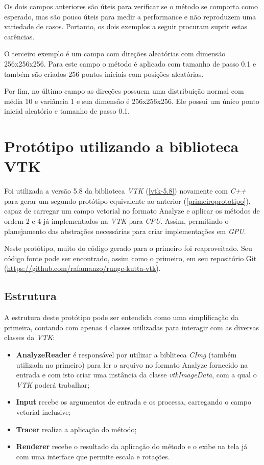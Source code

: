   Os dois campos anteriores são úteis para verificar se o método se comporta como esperado, mas são pouco úteis para medir a performance e não reproduzem uma variedade de casos. Portanto, os dois exemplos a seguir procuram suprir estas carências.
  
  O terceiro exemplo é um campo com direções aleatórias com dimensão 256x256x256. Para este campo o método é aplicado com tamanho de passo 0.1 e também são criados 256 pontos iniciais com posições aleatórias.
  
  Por fim, no último campo as direções possuem uma distribuição normal com média 10 e variância 1 e sua dimensão é 256x256x256. Ele possui um único ponto inicial aleatório e tamanho de passo 0.1.

\section{Protótipo utilizando a biblioteca VTK}
  Foi utilizada a versão 5.8 da biblioteca \textit{VTK} (\ref{vtk-5.8}) novamente com \textit{C++} para gerar um segundo protótipo equivalente ao anterior (\ref{primeiroprototipo}), capaz de carregar um campo vetorial no formato Analyze e aplicar os métodos de ordem 2 e 4 já implementados na \textit{VTK} para \textit{CPU}. Assim, permitindo o planejamento das abstrações necessárias para criar implementações em \textit{GPU}.
  
  Neste protótipo, muito do código gerado para o primeiro foi reaproveitado. Seu código fonte pode ser encontrado, assim como o primeiro, em seu repositório Git (\href{https://github.com/rafamanzo/runge-kutta-vtk}{https://github.com/rafamanzo/runge-kutta-vtk}).
  
  \subsection{Estrutura}
  A estrutura deste protótipo pode ser entendida como uma simplificação da primeira, contando com apenas 4 classes utilizadas para interagir com as diversas classes da \textit{VTK}:
  \begin{itemize}
    \item \textbf{AnalyzeReader} é responsável por utilizar a bibliteca \textit{CImg} (também utilizada no primeiro) para ler o arquivo no formato Analyze fornecido na entrada e com isto criar uma instância da classe \textit{vtkImageData}, com a qual o \textit{VTK} poderá trabalhar;
    \item \textbf{Input} recebe os argumentos de entrada e os processa, carregando o campo vetorial inclusive;
    \item \textbf{Tracer} realiza a aplicação do método;
    \item \textbf{Renderer} recebe o resultado da aplicação do método e o exibe na tela já com uma interface que permite escala e rotações.
  \end{itemize}

